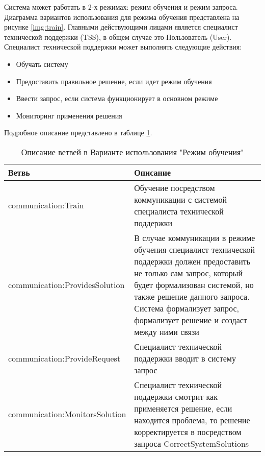 Система может работать в 2-х режимах: режим обучения и режим запроса. Диаграмма вариантов использования для режима обучения представлена на рисунке \ref{img:train}. Главными действующими лицами является специалист технической поддержки (TSS), в общем случае это Пользователь (User). Специалист технической поддержки может выполнять следующие действия:
\begin{itemize}
	\item Обучать систему
	\item Предоставить правильное решение, если идет режим обучения
	\item Ввести запрос, если система функционирует в основном режиме
	\item Мониторинг применения решения 
\end{itemize} \par
Подробное описание представлено в таблице \ref{TrainUseCaseTable}.

\begin{table} [htbp]
  \center
  \parbox{15cm}{\caption{Описание ветвей в Варианте использования "Режим обучения" }\label{TrainUseCaseTable}}
  \begin{tabular}{| p{7cm} | p{7cm} |}
  
  \hline
Ветвь & Описание \\
  
    \hline
communication:Train	& Обучение посредством коммуникации с системой специалиста технической поддержки \\
  \hline
communication:ProvidesSolution  & В случае коммуникации в режиме обучения специалист технической поддержки должен предоставить не только сам запрос, который будет формализован системой, но также решение данного запроса. Система формализует запрос, формализует решение и создаст между ними связи \\
  \hline
communication:ProvideRequest & Специалист технической поддержки вводит в систему запрос \\
  \hline
communication:MonitorsSolution  & Специалист технической поддержки смотрит как применяется решение, если находится проблема, то решение корректируется в посредством запроса CorrectSystemSolutions \\
  \hline
  \hline
  \end{tabular}
\end{table}


